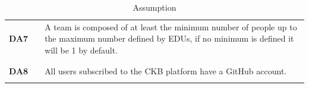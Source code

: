 \begin{table}[H]
\begin{tabular}{l l p{10.5cm}}
        \textbf{DA7} & \vline & A team is composed of at least the minimum number of people up to the maximum number defined by EDUs, if no minimum is defined it will be 1 by default.                                                                                             \\
                     &        &                                                                                                                                                                                                                                                     \\\hline & & \\
        \textbf{DA8} & \vline & All users subscribed to the CKB platform have a GitHub account.                                                                                                                                                                                     \\
                     &        &                                                                                                                                                                                                                                                     \\
        \hline
    \end{tabular}
    \caption{Assumption}
\end{table}

